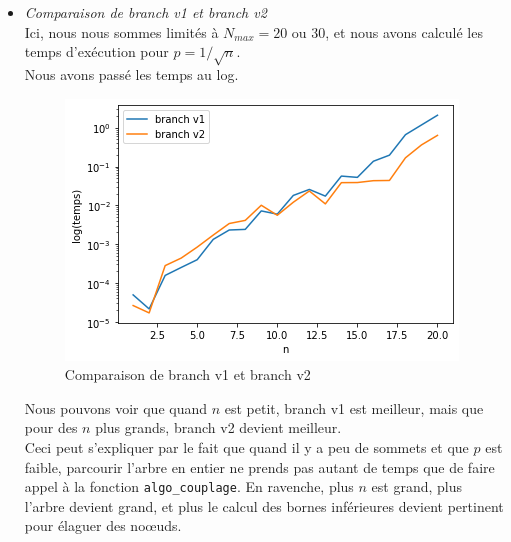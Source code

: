 \documentclass[12pt]{article}
\begin{document}
        \begin{itemize}
            \item \textit{Comparaison de branch v1 et branch v2} \\
                Ici, nous nous sommes limités à $N_{max} = 20$ ou 30, et nous avons calculé les temps d'exécution pour $p = 1/\sqrt{n}$. \\
                Nous avons passé les temps au log.
    
                \begin{figure}[H]
                    \caption{Comparaison de branch v1 et branch v2}
                    \includegraphics[scale=0.6]{figures/branch1-2_psqrt.png}
                    \centering
                \end{figure}
    
                Nous pouvons voir que quand $n$ est petit, branch v1 est meilleur, mais que pour des $n$ plus grands, branch v2 devient meilleur. \\
                Ceci peut s'expliquer par le fait que quand il y a peu de sommets et que $p$ est faible, parcourir l'arbre en entier ne prends pas autant de temps que de faire appel à la fonction \texttt{algo\_couplage}. En ravenche, plus $n$ est grand, plus l'arbre devient grand, et plus le calcul des bornes inférieures devient pertinent pour élaguer des noœuds.


\end{itemize}
\end{document}
